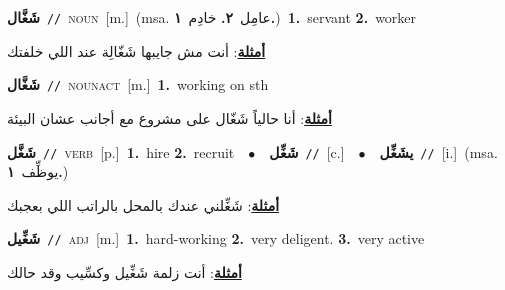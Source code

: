 \documentclass[10pt,a4paper,twoside]{article} %
\begin{document}
\begin{multicols}{2}
{\setlength\topsep{0pt}\textbf{\foreignlanguage{arabic}{شَغَّال}}\ {\color{gray}\texttt{//}\color{black}}\ \textsc{noun}\ [m.]\ \color{gray}(msa. \foreignlanguage{arabic}{عامِل}~\foreignlanguage{arabic}{\textbf{٢.}}  \foreignlanguage{arabic}{خادِم}~\foreignlanguage{arabic}{\textbf{١.}})\color{black}\ \textbf{1.}~servant  \textbf{2.}~worker\  \begin{flushright}\color{gray}\foreignlanguage{arabic}{\textbf{\underline{\foreignlanguage{arabic}{أمثلة}}}: أنت مش جايبها شَغّالِة عند اللي خلفتك}\end{flushright}\color{black}} \vspace{2mm}

{\setlength\topsep{0pt}\textbf{\foreignlanguage{arabic}{شَغَّال}}\ {\color{gray}\texttt{//}\color{black}}\ \textsc{noun\textunderscore act}\ [m.]\ \textbf{1.}~working on sth\  \begin{flushright}\color{gray}\foreignlanguage{arabic}{\textbf{\underline{\foreignlanguage{arabic}{أمثلة}}}: أنا حالياً شَغّال على مشروع مع أجانب عشان البيئة}\end{flushright}\color{black}} \vspace{2mm}

{\setlength\topsep{0pt}\textbf{\foreignlanguage{arabic}{شَغَّل}}\ {\color{gray}\texttt{//}\color{black}}\ \textsc{verb}\ [p.]\ \textbf{1.}~hire  \textbf{2.}~recruit\ \ $\bullet$\ \ \setlength\topsep{0pt}\textbf{\foreignlanguage{arabic}{شَغِّل}}\ {\color{gray}\texttt{//}\color{black}}\ [c.]\ \ $\bullet$\ \ \setlength\topsep{0pt}\textbf{\foreignlanguage{arabic}{يشَغِّل}}\ {\color{gray}\texttt{//}\color{black}}\ [i.]\ \color{gray}(msa. \foreignlanguage{arabic}{يوظِّف}~\foreignlanguage{arabic}{\textbf{١.}})\color{black}\  \begin{flushright}\color{gray}\foreignlanguage{arabic}{\textbf{\underline{\foreignlanguage{arabic}{أمثلة}}}: شَغِّلني عندك بالمحل بالراتب اللي بعجبك}\end{flushright}\color{black}} \vspace{2mm}

{\setlength\topsep{0pt}\textbf{\foreignlanguage{arabic}{شَغِّيل}}\ {\color{gray}\texttt{//}\color{black}}\ \textsc{adj}\ [m.]\ \textbf{1.}~hard-working  \textbf{2.}~very deligent.  \textbf{3.}~very active\  \begin{flushright}\color{gray}\foreignlanguage{arabic}{\textbf{\underline{\foreignlanguage{arabic}{أمثلة}}}: أنت زلمة شَغِّيل وكسِّيب وقد حالك}\end{flushright}\color{black}} \vspace{2mm}


\end{multicols}
\end{document}
